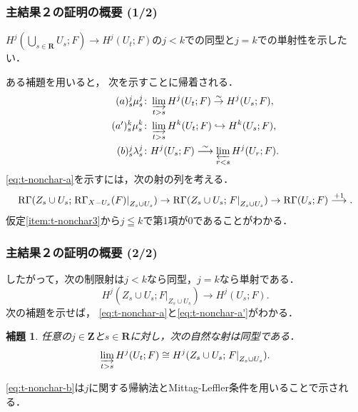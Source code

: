 \documentclass[dvipdfmx,10pt,aspectratio=169,leqno]{beamer}%
\newcommand{\zz}{\mathbf{Z}}
\newcommand{\rr}{\mathbf{R}}
\newcommand{\dip}{\displaystyle} %
\numberwithin{equation}{subsection}
\newcommand{\RG}{\mathop{\mathrm{R}\hspace{-0pt}\Gamma}\nolimits}
\newcommand{\simar}{\mathrel{\overset{\sim}{\rightarrow}}}%
\newcommand{\simarr}{\mathrel{\overset{\sim}{\longrightarrow}}}%
\newcommand{\indlim}[1][]{\mathop{\varinjlim}\limits_{#1}}
\newcommand{\prolim}[1][]{\mathop{\varprojlim}\limits_{#1}}
\newcommand{\mres}[2][]{{\left.{#1}\right\rvert}_{#2}}
\theoremstyle{mystyle}
\newtheorem{LMM}[AXM]{補題}
\begin{document}
\begin{frame}
  \frametitle{主結果２の証明の概要 (1/2)}
  \(\dip 
    H^{j}\left(\bigcup_{s\in\rr}U_{s};F\right)
    \to
    H^{j}\left(U_{t};F\right)
  \)の\(j<k\)での同型と\(j=k\)での単射性を示したい．

  ある補題\cite[Proposition 1.12.6]{KS90}を用いると，
  次を示すことに帰着される．
  \begin{align}
    \tag*{\((a)^j_s\)}\label{eq:t-nonchar-a}
    \mu_{s}^{j}&\colon
    \indlim[t>s] H^{j}(U_t;F) \simar H^{j}(U_s;F),\\
    \tag*{\((a')^k_s\)}\label{eq:t-nonchar-a'}
    \mu_{s}^{k}&\colon
    \indlim[t>s] H^{k}(U_t;F) \hookrightarrow H^{k}(U_s;F),\\
    \tag*{\((b)^j_s\)}\label{eq:t-nonchar-b}
    \lambda_{s}^{j}&\colon
    H^{j}(U_s;F)\simarr \prolim[r<s] H^{j}(U_r;F).
  \end{align}
  \ref{eq:t-nonchar-a}を示すには，次の射の列を考える．
  \begin{equation*}%
    \RG(Z_{s}\cup U_{s};\mres[\RG_{X- U_{s}}(F)]{Z_{s}\cup U_{s}})
    \to
    \RG(Z_{s}\cup U_{s};\mres[F]{Z_{s}\cup U_{s}})
    \to
    \RG(U_{s};F)
    \overset{+1}{\longrightarrow}. 
  \end{equation*}
  仮定\eqref{item:t-nonchar3}から\(j\leqq k\)で第1項が\(0\)であることがわかる．
\end{frame}

\begin{frame}
  \frametitle{主結果２の証明の概要 (2/2)}
  したがって，次の制限射は\(j<k\)なら同型，\(j=k\)なら単射である．
  \[
    H^{j}(Z_{s}\cup U_{s};\mres[F]{Z_{s}\cup U_{s}})
    \to
    H^{j}(U_{s};F).
  \]
  次の補題を示せば，
  \ref{eq:t-nonchar-a}と\ref{eq:t-nonchar-a'}がわかる．
  \begin{LMM}%
    任意の\(j\in\zz\)と\(s\in\rr\)に対し，次の自然な射は同型である．
    \[
      \indlim[t>s]H^{j}(U_t;F)
      \cong 
      H^{j}(Z_{s}\cup U_{s};\mres[F]{Z_{s}\cup U_{s}}).
    \]
  \end{LMM}
  \ref{eq:t-nonchar-b}は\(j\)に関する帰納法とMittag-Leffler条件を用いることで示される．
\end{frame}
\end{document}
